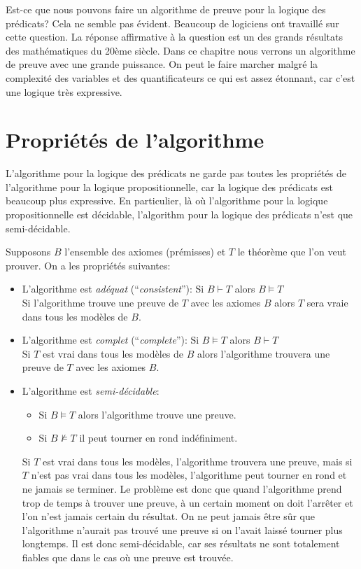 {Est-ce que nous pouvons faire un algorithme de preuve pour la logique des prédicats?
Cela ne semble pas évident.
Beaucoup de logiciens ont travaillé sur cette question.
La réponse affirmative à la question est un des grands résultats des mathématiques du 20ème siècle.
Dans ce chapitre nous verrons un algorithme de preuve avec une grande puissance.
On peut le faire marcher malgré la complexité des variables et des quantificateurs ce qui est assez étonnant,
car c'est une logique très expressive. 

\section{Propriétés de l'algorithme}

L'algorithme pour la logique des prédicats
ne garde pas toutes les propriétés de l'algorithme pour la logique propositionnelle,
car la logique des prédicats est beaucoup plus expressive.
En particulier, là où l'algorithme pour la logique propositionnelle est décidable,
l'algorithm pour la logique des prédicats n'est que semi-décidable.

Supposons $B$ l'ensemble des axiomes (prémisses) et $T$ le théorème que l'on veut prouver.
On a les propriétés suivantes:
\begin{itemize}
\item L'algorithme est {\em adéquat} (``{\em consistent}''): Si $B\vdash T$ alors $B \models T$\\
Si l'algorithme trouve une preuve de $T$ avec les axiomes $B$ alors $T$ sera vraie dans tous les modèles de $B$.
\item L'algorithme est {\em complet} (``{\em complete}''): Si $B \models T$ alors $B\vdash T$\\
Si $T$ est vrai dans tous les modèles de $B$ alors l'algorithme trouvera une preuve de $T$ avec les axiomes $B$.
\item L'algorithme est {\em semi-décidable}:
\begin{itemize}
\item Si $B \models T$ alors l'algorithme trouve une preuve. 
\item Si $B \not\models T$ il peut tourner en rond indéfiniment.
\end{itemize}
Si $T$ est vrai dans tous les modèles, l'algorithme trouvera une preuve, mais si $T$ n'est pas
vrai dans tous les modèles, l'algorithme peut tourner en rond et ne jamais se terminer.
Le problème est donc que quand l'algorithme prend trop de temps à trouver une preuve,
à un certain moment on doit l'arrêter et l'on n'est jamais certain du résultat.
On ne peut jamais être sûr que l'algorithme n'aurait pas trouvé une preuve si on l'avait laissé tourner plus longtemps.
Il est donc semi-décidable, car ses résultats ne sont totalement fiables que dans le cas où une preuve est trouvée.
\end{itemize}

}
